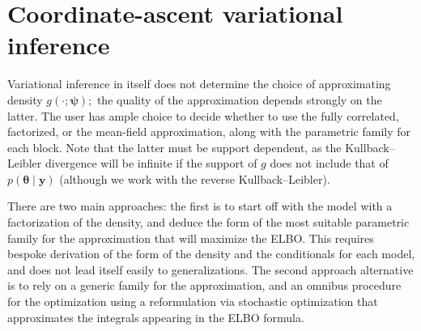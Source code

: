 \documentclass[
  11pt,
  letterpaper,
]{scrbook}
\theoremstyle{plain}
\theoremstyle{plain}
\theoremstyle{plain}
\theoremstyle{definition}
\theoremstyle{definition}
\theoremstyle{definition}
\theoremstyle{remark}
\begin{document}
\section{Coordinate-ascent variational
inference}\label{coordinate-ascent-variational-inference}

Variational inference in itself does not determine the choice of
approximating density \(g(\cdot; \boldsymbol{\psi});\) the quality of
the approximation depends strongly on the latter. The user has ample
choice to decide whether to use the fully correlated, factorized, or the
mean-field approximation, along with the parametric family for each
block. Note that the latter must be support dependent, as the
Kullback--Leibler divergence will be infinite if the support of \(g\)
does not include that of \(p(\boldsymbol{\theta} \mid \boldsymbol{y})\)
(although we work with the reverse Kullback--Leibler).

There are two main approaches: the first is to start off with the model
with a factorization of the density, and deduce the form of the most
suitable parametric family for the approximation that will maximize the
ELBO. This requires bespoke derivation of the form of the density and
the conditionals for each model, and does not lead itself easily to
generalizations. The second approach alternative is to rely on a generic
family for the approximation, and an omnibus procedure for the
optimization using a reformulation via stochastic optimization that
approximates the integrals appearing in the ELBO formula.
\end{document}
